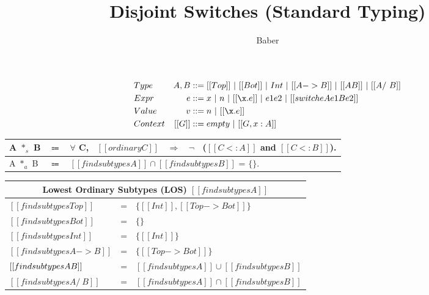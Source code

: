 \documentclass[a4paper]{article}
\title{Disjoint Switches (Standard Typing)}
\author{Baber}
\begin{document}
\maketitle

\begin{align*}
&Type &A, B&::= [[Top]] ~ | ~[[Bot]]~|~ Int ~|~ [[A->B]]~ |~ [[A \/ B]] ~ |~ [[A /\ B]]\\
&Expr &e &::= x ~|~ n ~|~[[\x.e]] ~ | ~ e1e2 ~|~ [[switch e A e1 B e2]]\\
&Value &v &::= n ~|~ [[\x.e]] \\
&Context & [[G]] &::= empty~ |~ [[G , x : A]]
\end{align*}


     {\renewcommand{\arraystretch}{1.5}
     \begin{center}
     \begin{tabular}{|lcl|}
       \hline
  A $*_s$ B & $\Coloneqq$ & $\forall$ C, \ $[[ordinary C]]$ \ $\Longrightarrow$ \ $\neg$ \ ($[[C <: A]]$ and $[[C <: B]]$). \\
       \hline
    A $*_a$ B & $\Coloneqq$ & $ [[findsubtypes A]] \cap [[findsubtypes B]] $ = $\{\}$. \\
       \hline
     \end{tabular}
     \end{center} }

    \centering
    {\renewcommand{\arraystretch}{1.2}
    \begin{tabular}{|lcl|}
      \multicolumn{3}{c}{Lowest Ordinary Subtypes (LOS) $[[findsubtypes A]]$} \\
      \hline
     $[[findsubtypes Top]]$ & = & $\{ [[Int]], [[Top -> Bot]]\}$  \\
     $[[findsubtypes Bot]]$ & = & $\{\}$  \\
     $[[findsubtypes Int]]$ & = & $\{ [[Int]] \}$  \\
     $[[findsubtypes A -> B]]$ & = & $\{ [[Top -> Bot]] \}$  \\
     $[[findsubtypes A \/ B]]$ & = & $ [[findsubtypes A]] \cup [[findsubtypes B]] $\\
     $[[findsubtypes A /\ B]]$ & = & $ [[findsubtypes A]] \cap [[findsubtypes B]] $\\
      \hline
    \end{tabular} }
    
\end{document}
